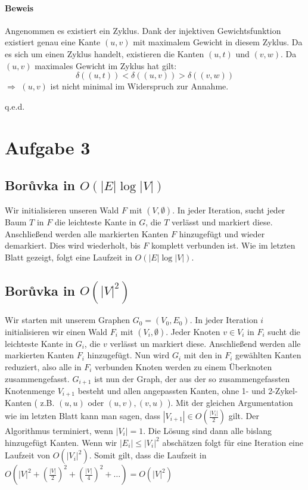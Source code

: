 \documentclass[a4paper,11pt,twoside]{scrartcl}
\newcommand{\qed}{%
	\begin{flushright}
		q.e.d.
	\end{flushright}%
	}
\begin{document}
\paragraph{Beweis}
Angenommen es existiert ein Zyklus. Dank der injektiven Gewichtsfunktion existiert genau eine Kante $(u,v)$ mit maximalem Gewicht in diesem Zyklus. Da es sich um einen Zyklus handelt, existieren die Kanten $(u,t)$ und $(v,w)$. Da $(u,v)$ maximales Gewicht im Zyklus hat gilt: \[ \delta((u,t)) < \delta((u,v)) > \delta((v,w)) \]
$\Rightarrow$ $(u,v)$ ist nicht minimal im Widerspruch zur Annahme.\qed
\section{Aufgabe 3}
\subsection{Bor\r{u}vka in $O(|E|\log|V|)$}
Wir initialisieren unseren Wald $F$ mit $(V,\emptyset)$. In jeder Iteration, sucht jeder Baum $T$ in $F$ die leichteste Kante in $G$, die $T$ verlässt und markiert diese. Anschließend werden alle markierten Kanten $F$ hinzugefügt und wieder demarkiert. Dies wird wiederholt, bis $F$ komplett verbunden ist. Wie im letzten Blatt gezeigt, folgt eine Laufzeit in $O(|E|\log|V|)$.
\subsection{Bor\r{u}vka in $O(|V|^2)$}
Wir starten mit unserem Graphen $G_0=(V_0,E_0)$. In jeder Iteration $i$ initialisieren wir einen Wald $F_i$ mit $(V_i,\emptyset)$. Jeder Knoten $v\in V_i$ in $F_i$ sucht die leichteste Kante in $G_i$, die $v$ verlässt un markiert diese. Anschließend werden alle markierten Kanten $F_i$ hinzugefügt. Nun wird $G_i$ mit den in $F_i$ gewählten Kanten reduziert, also alle in $F_i$ verbunden Knoten werden zu einem Überknoten zusammengefasst. $G_{i+1}$ ist nun der Graph, der aus der so zusammengefassten Knotenmenge $V_{i+1}$ besteht und allen angepassten Kanten, ohne 1- und 2-Zykel-Kanten ( z.B. $(u,u)$ oder $(u,v),(v,u)$ ). Mit der gleichen Argumentation wie im letzten Blatt kann man sagen, dass $|V_{i+1}| \in O\left(\frac{|V_i|}{2}\right)$ gilt. Der Algorithmus terminiert, wenn $|V_i| = 1$. Die Lösung sind dann alle bislang hinzugefügt Kanten. Wenn wir $|E_i| \leq |V_i|^2$ abschätzen folgt für eine Iteration eine Laufzeit von $O(|V_i|^2)$. Somit gilt, dass die Laufzeit in $O\left( |V|^2 + \left(\frac{|V|}{2}\right)^2 + \left(\frac{|V|}{4}\right)^2+\ldots \right) = O(|V|^2)$
\end{document}
